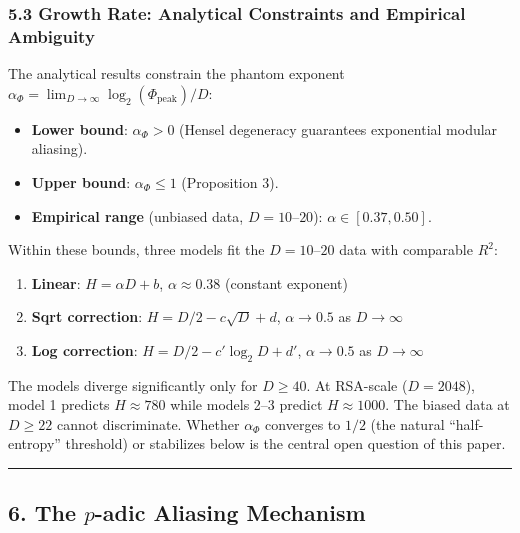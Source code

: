 \documentclass[
  11pt,
]{article}
\providecommand{\tightlist}{%
  \setlength{\itemsep}{0pt}\setlength{\parskip}{0pt}}
\begin{document}
\subsubsection{5.3 Growth Rate: Analytical Constraints and Empirical
Ambiguity}\label{growth-rate-analytical-constraints-and-empirical-ambiguity}

The analytical results constrain the phantom exponent
\(\alpha_\Phi = \lim_{D \to \infty} \log_2(\Phi_{\text{peak}})/D\):

\begin{itemize}
\tightlist
\item
  \textbf{Lower bound}: \(\alpha_\Phi > 0\) (Hensel degeneracy guarantees
  exponential modular aliasing).
\item
  \textbf{Upper bound}: \(\alpha_\Phi \leq 1\) (Proposition 3).
\item
  \textbf{Empirical range} (unbiased data, \(D = 10\)--\(20\)):
  \(\alpha \in [0.37, 0.50]\).
\end{itemize}

Within these bounds, three models fit the \(D = 10\)--\(20\) data with
comparable \(R^2\):

\begin{enumerate}
\def\labelenumi{\arabic{enumi}.}
\tightlist
\item
  \textbf{Linear}: \(H = \alpha D + b\), \(\alpha \approx 0.38\) (constant
  exponent)
\item
  \textbf{Sqrt correction}: \(H = D/2 - c \sqrt{D} + d\), \(\alpha \to 0.5\) as
  \(D \to \infty\)
\item
  \textbf{Log correction}: \(H = D/2 - c' \log_2 D + d'\), \(\alpha \to 0.5\) as
  \(D \to \infty\)
\end{enumerate}

The models diverge significantly only for \(D \geq 40\). At RSA-scale
(\(D = 2048\)), model 1 predicts \(H \approx 780\) while models 2--3 predict
\(H \approx 1000\). The biased data at \(D \geq 22\) cannot discriminate.
Whether \(\alpha_\Phi\) converges to \(1/2\) (the natural ``half-entropy''
threshold) or stabilizes below is the central open question of this paper.

\begin{center}\rule{0.5\linewidth}{0.5pt}\end{center}

\newpage

\subsection{\texorpdfstring{6. The \(p\)-adic Aliasing
Mechanism}{6. The p-adic Aliasing Mechanism}}\label{the-p-adic-aliasing-mechanism}
\end{document}
